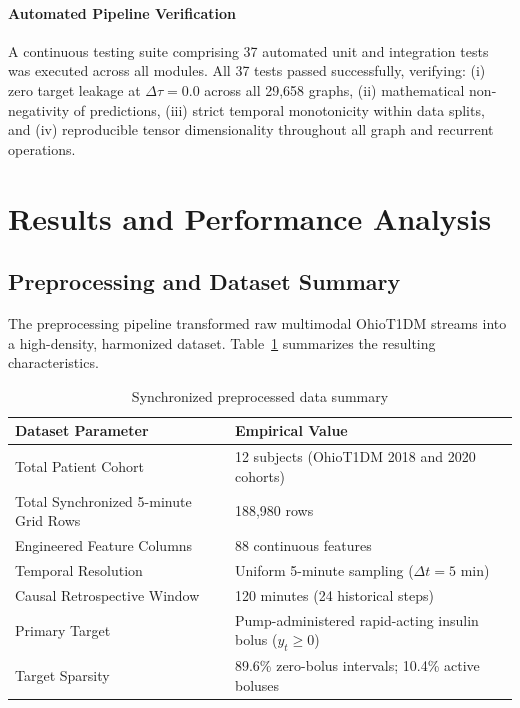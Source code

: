 \documentclass[10pt,a4paper]{article}
\begin{document}
\paragraph{Automated Pipeline Verification}
A continuous testing suite comprising 37 automated unit and integration tests was executed across all modules. All 37 tests passed successfully, verifying: (i) zero target leakage at $\Delta\tau = 0.0$ across all 29,658 graphs, (ii) mathematical non-negativity of predictions, (iii) strict temporal monotonicity within data splits, and (iv) reproducible tensor dimensionality throughout all graph and recurrent operations.

\section{Results and Performance Analysis}

\subsection{Preprocessing and Dataset Summary}
The preprocessing pipeline transformed raw multimodal OhioT1DM streams into a high-density, harmonized dataset. Table~\ref{tab:prep} summarizes the resulting characteristics.

\begin{table}[htbp]
\caption{Synchronized preprocessed data summary}\label{tab:prep}
\small
\begin{tabular*}{\textwidth}{@{\extracolsep{\fill}}ll@{}}
\toprule
Dataset Parameter & Empirical Value \\
\midrule
Total Patient Cohort & 12 subjects (OhioT1DM 2018 and 2020 cohorts) \\
Total Synchronized 5-minute Grid Rows & 188,980 rows \\
Engineered Feature Columns & 88 continuous features \\
Temporal Resolution & Uniform 5-minute sampling ($\Delta t = 5$ min) \\
Causal Retrospective Window & 120 minutes (24 historical steps) \\
Primary Target & Pump-administered rapid-acting insulin bolus ($y_t \ge 0$) \\
Target Sparsity & 89.6\% zero-bolus intervals; 10.4\% active boluses \\
\bottomrule
\end{tabular*}
\end{table}
\end{document}
